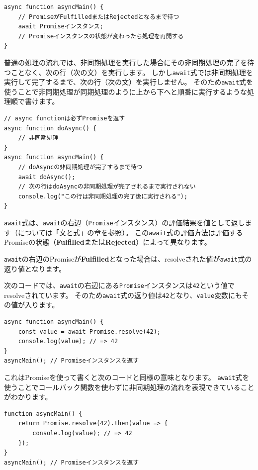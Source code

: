 \begin{lstlisting}
async function asyncMain() {
    // PromiseがFulfilledまたはRejectedとなるまで待つ
    await Promiseインスタンス;
    // Promiseインスタンスの状態が変わったら処理を再開する
}
\end{lstlisting}

普通の処理の流れでは、非同期処理を実行した場合にその非同期処理の完了を待つことなく、次の行（次の文）を実行します。
しかし\texttt{await}式では非同期処理を実行して完了するまで、次の行（次の文）を実行しません。
そのため\texttt{await}式を使うことで非同期処理が同期処理のように上から下へと順番に実行するような処理順で書けます。

\begin{lstlisting}
// async functionは必ずPromiseを返す
async function doAsync() {
    // 非同期処理
}
async function asyncMain() {
    // doAsyncの非同期処理が完了するまで待つ
    await doAsync();
    // 次の行はdoAsyncの非同期処理が完了されるまで実行されない
    console.log("この行は非同期処理の完了後に実行される");
}
\end{lstlisting}

\texttt{await}式は、\texttt{await}の右辺（\texttt{Promise}インスタンス）の評価結果を値として返します（\textbf{}については「\hyperlink{statement-and-expression}{文と式}」の章を参照）。
この\texttt{await}式の評価方法は評価するPromiseの状態（\textbf{Fulfilled}または\textbf{Rejected}）によって異なります。

\texttt{await}の右辺のPromiseが\textbf{Fulfilled}となった場合は、resolveされた値が\texttt{await}式の返り値となります。

次のコードでは、\texttt{await}の右辺にある\texttt{Promise}インスタンスは\texttt{42}という値でresolveされています。
そのため\texttt{await}式の返り値は\texttt{42}となり、\texttt{value}変数にもその値が入ります。

\begin{lstlisting}
async function asyncMain() {
    const value = await Promise.resolve(42);
    console.log(value); // => 42
}
asyncMain(); // Promiseインスタンスを返す
\end{lstlisting}

これはPromiseを使って書くと次のコードと同様の意味となります。
\texttt{await}式を使うことでコールバック関数を使わずに非同期処理の流れを表現できていることがわかります。

\begin{lstlisting}
function asyncMain() {
    return Promise.resolve(42).then(value => {
        console.log(value); // => 42
    });
}
asyncMain(); // Promiseインスタンスを返す
\end{lstlisting}

